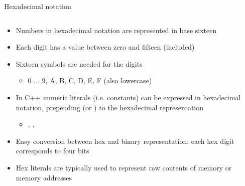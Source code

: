 \begin{frame}{Hexadecimal notation}

  \begin{columns}
    \begin{column}{.75\textwidth}
      \begin{itemize}
      \item<1-> Numbers in hexadecimal notation are represented in base sixteen
      \item<2-> Each digit has a value between zero and fifteen (included)
      \item<2-> Sixteen symbols are needed for the digits
        \begin{itemize}
        \item 0 ... 9, A, B, C, D, E, F (also lowercase)
        \end{itemize}
      \item<3-> In C++ numeric literals (i.e. constants) can be expressed in hexadecimal
        notation, prepending  (or ) to the hexadecimal representation
        \begin{itemize}
        \item {}, , 
        \end{itemize}
      \item<3-> Easy conversion between hex and binary representation: each hex digit
        corresponds to four bits
      \item<4-> Hex literals are typically used to represent raw contents of memory or
        memory addresses
      \end{itemize}

    \end{column}


\end{columns}
\end{frame}
